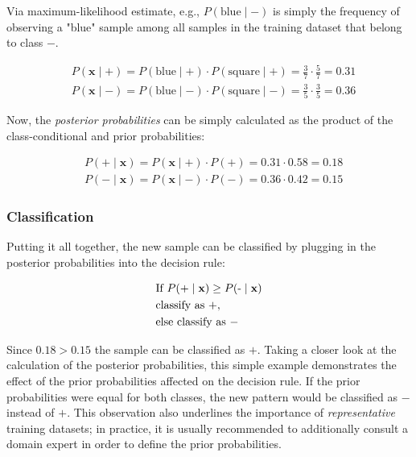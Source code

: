 \documentclass{article}
\begin{document}
Via maximum-likelihood estimate, e.g., $P(\text{blue} \mid -)$ is simply the frequency of observing a "blue" sample among all samples in the training dataset that belong to class $-$.

\begin{equation} 
\begin{split}
& P(\textbf{x} \mid +) = P(\text{blue} \mid +) \cdot P(\text{square} \mid +) = \frac{3}{7} \cdot \frac{5}{7} = 0.31  \\
& P(\textbf{x} \mid -) = P(\text{blue} \mid -) \cdot P(\text{square} \mid -) = \frac{3}{5} \cdot \frac{3}{5} = 0.36 
\end{split}
\end{equation} 


Now,  the \emph{posterior probabilities} can be simply calculated as the product of the class-conditional and prior probabilities:

\begin{equation} 
\begin{split}
& P(+ \mid \textbf{x}) = P(\textbf{x} \mid +) \cdot P(+) = 0.31  \cdot  0.58 = 0.18  \\
& P(- \mid \textbf{x}) = P(\textbf{x} \mid -) \cdot P(-) = 0.36  \cdot  0.42 = 0.15
\end{split}
\end{equation} 


\subsubsection{Classification}

Putting it all together, the new sample can be classified by plugging in the posterior probabilities into the decision rule:

\begin{equation} 
\begin{split}
&\text{If } P(+ \mid \textbf x) \geq P(\text{-} \mid \textbf{x})  \\
&\text{classify as }+, \\
& \text{else } \text{classify as } -
\end{split}
\end{equation} 

Since $0.18 > 0.15$  the sample can be classified as $+$. Taking a closer look at the calculation of the posterior probabilities, this simple example demonstrates the effect of the prior probabilities affected on the decision rule. If the prior probabilities were equal for both classes, the new pattern would be classified as $-$ instead of $+$. This observation also underlines the importance of \emph{representative} training datasets; in practice, it is usually recommended to additionally consult a domain expert in order to define the prior probabilities.
\end{document}
